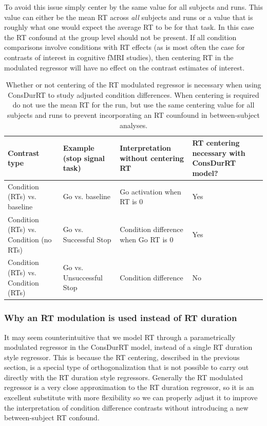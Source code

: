 \documentclass[titlepage,12pt] {article}
\begin{document}
To avoid this issue simply center by the same value for all subjects and runs.  This value can either be the mean RT across \emph{all} subjects and runs or a value that is roughly what one would expect the average RT to be for that task.  In this case the RT confound at the group level should not be present.  If all condition comparisons involve conditions with RT effects (as is most often the case for contrasts of interest in cognitive fMRI studies), then centering RT in the modulated regressor will have no effect on the contrast estimates of interest.

\begin{table}[h!]
  \begin{center}
   \begin{tabular}{|L{4cm}|L{3.25cm}|L{3.9cm}|L{3.7cm}|} \hline
      Contrast type & Example  \newline (stop signal task) & Interpretation without centering RT & RT centering necessary with ConsDurRT model? \\ \hline\hline
      Condition (RTs) vs. baseline & Go  vs. \newline baseline & Go activation when RT is 0 & Yes \\ \hline
      Condition (RTs) vs. Condition (no RTs) & Go vs. \newline  Successful Stop  & Condition difference when Go RT is 0 & Yes \\ \hline
      Condition (RTs) vs. Condition (RTs) & Go vs. \newline  Unsuccessful Stop & Condition difference & No \\ \hline
    \end{tabular}
        \caption{Whether or not centering of the RT modulated regressor is necessary when using ConsDurRT to study adjusted condition differences.  When centering is required do not use the mean RT for the run, but use the same centering value for all subjects and runs to prevent incorporating an RT counfound in between-subject analyses.}\label{tab:centering-rt}
   \end{center}
 \end{table}


\subsubsection*{Why an RT modulation is used instead of RT duration}

It may seem counterintuitive that we model RT through a parametrically modulated regressor in the ConsDurRT model, instead of a single RT duration style regressor.  This is because the RT centering, described in the previous section, is a special type of orthogonalization that is not possible to carry out directly with the RT duration style regressors.  Generally the RT modulated regressor is a very close approximation to the RT duration regressor, so it is an excellent substitute with more flexibility so we can properly adjust it to improve the interpretation of condition difference contrasts without introducing a new between-subject RT confound.  
\end{document}
